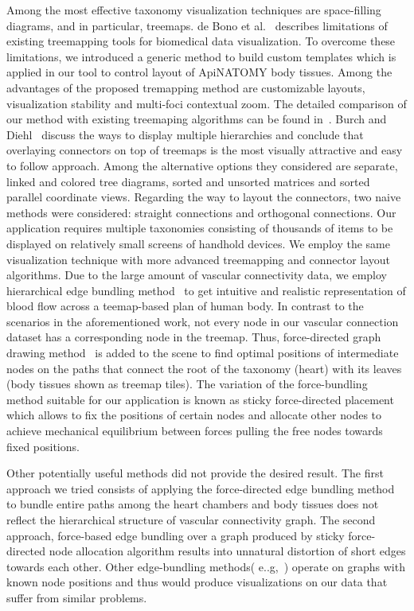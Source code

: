 Among the most effective taxonomy visualization techniques are space-filling diagrams, and in particular, treemaps.
de Bono et al.~\cite{BGS12} describes limitations of existing treemapping tools for biomedical data visualization. To overcome these limitations, we introduced a generic method to build custom templates which is applied in our tool to control layout of ApiNATOMY body tissues. Among the advantages of the proposed tremapping method are customizable layouts, visualization stability and multi-foci contextual zoom. The detailed comparison of our method with existing treemaping algorithms can be found in~\cite{KBK14}.
Burch and Diehl~\cite{BD06} discuss the ways to display multiple hierarchies and conclude that overlaying connectors on top of treemaps is the most visually attractive and easy to follow approach. Among the alternative options they considered are separate, linked and colored tree diagrams, sorted and unsorted matrices and sorted parallel coordinate views. Regarding the way to layout the connectors, two naive methods were considered: straight connections and orthogonal connections. %
Our application requires multiple taxonomies consisting of thousands of items to be displayed on relatively small screens of handhold devices. We employ the same visualization technique with more advanced treemapping and connector layout algorithms. Due to the large amount of vascular connectivity data, we employ hierarchical edge bundling method~\cite{Hol06} to get intuitive and realistic representation of blood flow across a teemap-based plan of human body.
In contrast to the scenarios in the aforementioned work, not every node in our vascular connection dataset has a corresponding node in the treemap. Thus, force-directed graph drawing method~\cite{BET+99} is added to the scene to find optimal positions of intermediate nodes on the paths that connect the root of the taxonomy (heart) with its leaves (body tissues shown as treemap tiles). The variation of the force-bundling method suitable for our application is known as sticky force-directed placement~\cite{FR91} which allows to fix the positions of certain nodes and allocate other nodes to achieve mechanical equilibrium between forces pulling the free nodes towards fixed positions.

Other potentially useful methods did not provide the desired result. The first approach we tried consists of applying the
force-directed edge bundling method~\cite{HW09} to bundle entire paths among the heart chambers and body tissues does not reflect the hierarchical structure of vascular connectivity graph. The second approach, force-based edge bundling over a graph produced by sticky force-directed node allocation algorithm results into unnatural distortion of short edges towards each other. Other edge-bundling methods( e..g,~\cite{GHN+11}\cite{HET12}\cite{SHH11}) operate on graphs with known node positions and thus would produce visualizations on our data that suffer from similar problems.



